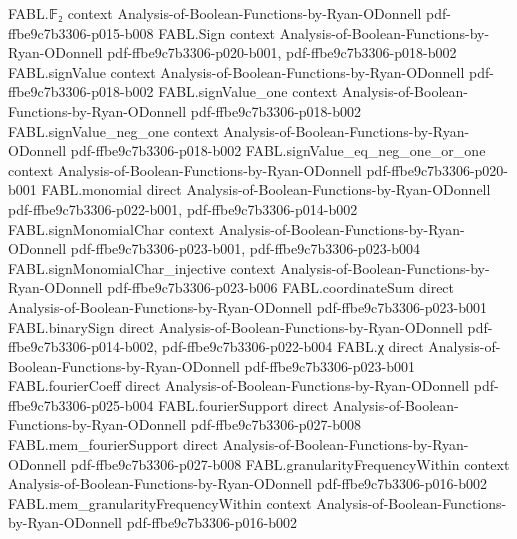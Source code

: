 \begin{theorem}
\label{FABL.exercise5_31c}
\leanok
{}
\proofstep
  {FABL.𝔽₂}
  {context}
  {Analysis-of-Boolean-Functions-by-Ryan-ODonnell}
  {pdf-ffbe9c7b3306-p015-b008}
\proofstep
  {FABL.Sign}
  {context}
  {Analysis-of-Boolean-Functions-by-Ryan-ODonnell}
  {pdf-ffbe9c7b3306-p020-b001,
    pdf-ffbe9c7b3306-p018-b002}
\proofstep
  {FABL.signValue}
  {context}
  {Analysis-of-Boolean-Functions-by-Ryan-ODonnell}
  {pdf-ffbe9c7b3306-p018-b002}
\proofstep
  {FABL.signValue_one}
  {context}
  {Analysis-of-Boolean-Functions-by-Ryan-ODonnell}
  {pdf-ffbe9c7b3306-p018-b002}
\proofstep
  {FABL.signValue_neg_one}
  {context}
  {Analysis-of-Boolean-Functions-by-Ryan-ODonnell}
  {pdf-ffbe9c7b3306-p018-b002}
\proofstep
  {FABL.signValue_eq_neg_one_or_one}
  {context}
  {Analysis-of-Boolean-Functions-by-Ryan-ODonnell}
  {pdf-ffbe9c7b3306-p020-b001}
\proofstep
  {FABL.monomial}
  {direct}
  {Analysis-of-Boolean-Functions-by-Ryan-ODonnell}
  {pdf-ffbe9c7b3306-p022-b001,
    pdf-ffbe9c7b3306-p014-b002}
\proofstep
  {FABL.signMonomialChar}
  {context}
  {Analysis-of-Boolean-Functions-by-Ryan-ODonnell}
  {pdf-ffbe9c7b3306-p023-b001,
    pdf-ffbe9c7b3306-p023-b004}
\proofstep
  {FABL.signMonomialChar_injective}
  {context}
  {Analysis-of-Boolean-Functions-by-Ryan-ODonnell}
  {pdf-ffbe9c7b3306-p023-b006}
\proofstep
  {FABL.coordinateSum}
  {direct}
  {Analysis-of-Boolean-Functions-by-Ryan-ODonnell}
  {pdf-ffbe9c7b3306-p023-b001}
\proofstep
  {FABL.binarySign}
  {direct}
  {Analysis-of-Boolean-Functions-by-Ryan-ODonnell}
  {pdf-ffbe9c7b3306-p014-b002,
    pdf-ffbe9c7b3306-p022-b004}
\proofstep
  {FABL.χ}
  {direct}
  {Analysis-of-Boolean-Functions-by-Ryan-ODonnell}
  {pdf-ffbe9c7b3306-p023-b001}
\proofstep
  {FABL.fourierCoeff}
  {direct}
  {Analysis-of-Boolean-Functions-by-Ryan-ODonnell}
  {pdf-ffbe9c7b3306-p025-b004}
\proofstep
  {FABL.fourierSupport}
  {direct}
  {Analysis-of-Boolean-Functions-by-Ryan-ODonnell}
  {pdf-ffbe9c7b3306-p027-b008}
\proofstep
  {FABL.mem_fourierSupport}
  {direct}
  {Analysis-of-Boolean-Functions-by-Ryan-ODonnell}
  {pdf-ffbe9c7b3306-p027-b008}
\proofstep
  {FABL.granularityFrequencyWithin}
  {context}
  {Analysis-of-Boolean-Functions-by-Ryan-ODonnell}
  {pdf-ffbe9c7b3306-p016-b002}
\proofstep
  {FABL.mem_granularityFrequencyWithin}
  {context}
  {Analysis-of-Boolean-Functions-by-Ryan-ODonnell}
  {pdf-ffbe9c7b3306-p016-b002}

\end{theorem}
